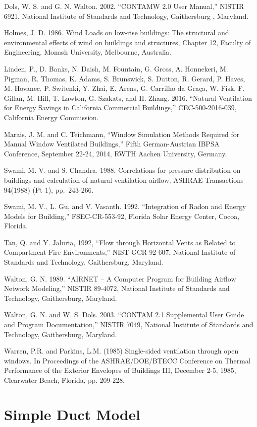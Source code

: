 Dols, W. S. and G. N. Walton. 2002. ``CONTAMW 2.0 User Manual,'' NISTIR 6921, National Institute of Standards and Technology, Gaithersburg , Maryland.

Holmes, J. D. 1986. Wind Loads on low-rise buildings: The structural and environmental effects of wind on buildings and structures, Chapter 12, Faculty of Engineering, Monash University, Melbourne, Australia.

Linden, P., D. Banks, N. Daish, M. Fountain, G. Gross, A. Honnekeri, M. Pigman, R. Thomas, K. Adams, 
S. Brunswick, S. Dutton, R. Gerard, P. Haves, M. Hovanec, P. Switenki, Y. Zhai, E. Arens, G. Carrilho da Gra\c{c}a, W. Fisk, F. Gillan, M. Hill, T. Lawton, G. Szakats, and H. Zhang. 2016. ``Natural Ventilation for Energy Savings in California Commercial Buildings,'' CEC-500-2016-039, California Energy Commission.

Marais, J. M. and C. Teichmann, ``Window Simulation Methods Required for Manual Window Ventilated Buildings,'' Fifth German-Austrian IBPSA Conference, September 22-24, 2014, RWTH Aachen University, Germany.

Swami, M. V. and S. Chandra. 1988. Correlations for pressure distribution on buildings and calculation of natural-ventilation airflow, ASHRAE Transactions 94(1988) (Pt 1), pp.~243-266.

Swami, M. V., L. Gu, and V. Vasanth. 1992. ``Integration of Radon and Energy Models for Building,'' FSEC-CR-553-92, Florida Solar Energy Center, Cocoa, Florida.

Tan, Q. and Y. Jaluria, 1992, ``Flow through Horizontal Vents as Related to Compartment Fire Environments,'' NIST-GCR-92-607, National Institute of Standards and Technology, Gaithersburg, Maryland.

Walton, G. N. 1989. ``AIRNET -- A Computer Program for Building Airflow Network Modeling,'' NISTIR 89-4072, National Institute of Standards and Technology, Gaithersburg, Maryland.

Walton, G. N. and W. S. Dols. 2003. ``CONTAM 2.1 Supplemental User Guide and Program Documentation,'' NISTIR 7049, National Institute of Standards and Technology, Gaithersburg, Maryland.

Warren, P.R. and Parkins, L.M. (1985) Single-sided ventilation through open windows. In Proceedings of the ASHRAE/DOE/BTECC Conference on Thermal Performance of the Exterior Envelopes of Buildings III, December 2-5, 1985, Clearwater Beach, Florida, pp. 209-228.

\section{Simple Duct Model}\label{simple-duct-model}

